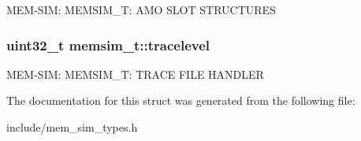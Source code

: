 M\-E\-M-\/\-S\-I\-M\-: M\-E\-M\-S\-I\-M\-\_\-\-T\-: A\-M\-O S\-L\-O\-T S\-T\-R\-U\-C\-T\-U\-R\-E\-S \hypertarget{structmemsim__t_a5adec994c4699e314a35284102cb1cb3}{
\subsubsection[{tracelevel}]{\setlength{\rightskip}{0pt plus 5cm}uint32\-\_\-t memsim\-\_\-t\-::tracelevel}}\label{structmemsim__t_a5adec994c4699e314a35284102cb1cb3}
M\-E\-M-\/\-S\-I\-M\-: M\-E\-M\-S\-I\-M\-\_\-\-T\-: T\-R\-A\-C\-E F\-I\-L\-E H\-A\-N\-D\-L\-E\-R 

The documentation for this struct was generated from the following file\-:\begin{DoxyCompactItemize}
\item 
include/mem\-\_\-sim\-\_\-types.\-h\end{DoxyCompactItemize}

